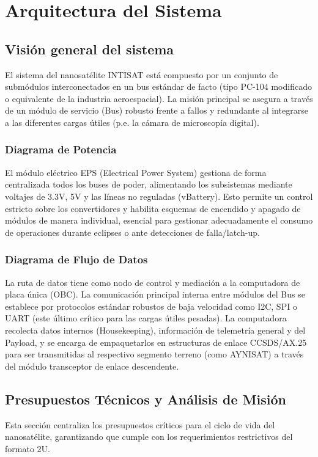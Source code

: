 \chapter{Arquitectura del Sistema}
\section{Visión general del sistema}
El sistema del nanosatélite INTISAT está compuesto por un conjunto de submódulos interconectados en un bus estándar de facto (tipo PC-104 modificado o equivalente de la industria aeroespacial). La misión principal se asegura a través de un módulo de servicio (Bus) robusto frente a fallos y redundante al integrarse a las diferentes cargas útiles (p.e. la cámara de microscopía digital).

\subsection{Diagrama de Potencia}
El módulo eléctrico EPS (Electrical Power System) gestiona de forma centralizada todos los buses de poder, alimentando los subsistemas mediante voltajes de 3.3V, 5V y las líneas no reguladas (vBattery). Esto permite un control estricto sobre los convertidores y habilita esquemas de encendido y apagado de módulos de manera individual, esencial para gestionar adecuadamente el consumo de operaciones durante eclipses o ante detecciones de falla/latch-up.

\subsection{Diagrama de Flujo de Datos}
La ruta de datos tiene como nodo de control y mediación a la computadora de placa única (OBC). La comunicación principal interna entre módulos del Bus se establece por protocolos estándar robustos de baja velocidad como I2C, SPI o UART (este último crítico para las cargas útiles pesadas). La computadora recolecta datos internos (Housekeeping), información de telemetría general y del Payload, y se encarga de empaquetarlos en estructuras de enlace CCSDS/AX.25 para ser transmitidas al respectivo segmento terreno (como AYNISAT) a través del módulo transceptor de enlace descendente.


\section{Presupuestos Técnicos y Análisis de Misión}
Esta sección centraliza los presupuestos críticos para el ciclo de vida del nanosatélite, garantizando que cumple con los requerimientos restrictivos del formato 2U.

